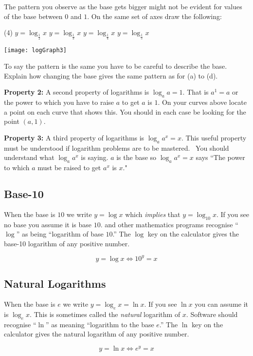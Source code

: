 The pattern you observe as the base gets bigger might not be evident for values of the base between $0$ and $1$. On the same set of axes draw the following: 

\begin{tasks}(4)
	\task $y =\log _{\frac{1}{2}} x$ 
\task $y =\log _{\frac{1}{3}} x$ 
	\task $y =\log _{\frac{1}{4}} x$ 
	\task $y =\log _{\frac{1}{5}} x$ \end{tasks}
\begin{center}\texttt{[image: logGraph3]}\end{center}
To say the pattern is the same you have to be careful to describe the base. Explain how changing the base gives the same pattern as for (a) to (d).

\textbf{Property 2:} A second property of logarithms is $\log _{a} a =1$. That is $a^{1} =a$ or the power to which you have to raise $a$ to get $a$ is $1$. On your curves above locate a point on each curve that shows this. You
should in each case be looking for the point $\left (a ,1\right )$. 

\textbf{Property 3:} A third property
of logarithms is $\log _{a} a^{x} =x$. This useful property must be understood if logarithm problems are to be mastered.
\ You should understand what $\log _{a} a^{x}$ is saying. $a$ is the base so $\log _{a} a^{x} =x$ says ``The power to which $a$ must be raised to get $a^{x}$ is $x$." 

\subsection*{Base-10}
When the base is $10$ we write $y =\log  x$ which \textit{implies} that $y=\log _{10} x$. If you see no base you assume it is base $10$. \Desmos and other mathematics programs recognise ``$\log $'' as being ``logarithm of base $10$.'' The $\log $ key on the calculator gives the base-10 logarithm of any positive number.
\begin{tcolorbox}
\begin{equation*}y =\log  x \Leftrightarrow 10^{y} =x
\end{equation*}
\end{tcolorbox}


\subsection*{Natural Logarithms}
When the base is $e$ we write $y =\log _{e} x =\ln  x$. If you see $\ln  x$ you can assume it is $\log _{e} x$. This is sometimes called the \emph{natural} logarithm of $x$. Software should recognise ``$\ln $'' as meaning ``logarithm to the base $e$.'' The $\ln $ key on the calculator gives the natural logarithm of any positive number.
\begin{tcolorbox}\begin{equation*}y =\ln  x \Leftrightarrow e^{y} =x
\end{equation*}\end{tcolorbox}

